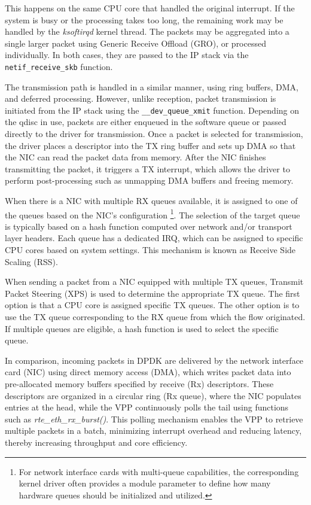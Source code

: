 This happens on the same CPU core that handled the original interrupt. If the system is busy or the processing takes too long, the remaining work may be handled by the \textit{ksoftirqd} kernel thread. 
The packets may be aggregated into a single larger packet using Generic Receive Offload (GRO), or processed individually. 
In both cases, they are passed to the IP stack via the \texttt{netif\_receive\_skb} function.

The transmission path is handled in a similar manner, using ring buffers, DMA, and deferred processing. 
However, unlike reception, packet transmission is initiated from the IP stack using the \texttt{\_\_dev\_queue\_xmit} function. 
Depending on the qdisc in use, packets are either enqueued in the software queue or passed directly to the driver for transmission.
Once a packet is selected for transmission, the driver places a descriptor into the TX ring buffer and sets up DMA so that the NIC can read the packet data from memory.
After the NIC finishes transmitting the packet, it triggers a TX interrupt, which allows the driver to perform post-processing such as unmapping DMA buffers and freeing memory.~\cite{linux-packet-input}

When there is a NIC with multiple RX queues available, it is assigned to one of the queues based on the NIC's configuration%
\footnote{For network interface cards with multi-queue capabilities, the corresponding kernel driver often provides a module parameter to define how many hardware queues should be initialized and utilized.}.
The selection of the target queue is typically based on a hash function computed over network and/or transport layer headers.
Each queue has a dedicated IRQ, which can be assigned to specific CPU cores based on system settings. This mechanism is known as Receive Side Scaling (RSS).

When sending a packet from a NIC equipped with multiple TX queues, Transmit Packet Steering (XPS) is used to determine the appropriate TX queue.
The first option is that a CPU core is assigned specific TX queues. The other option is to use the TX queue corresponding to the RX queue from which the flow originated.
If multiple queues are eligible, a hash function is used to select the specific queue.~\cite{linux-rss}

In comparison, incoming packets in DPDK are delivered by the network interface card (NIC) using direct memory access (DMA),
which writes packet data into pre-allocated memory buffers specified by receive (Rx) descriptors.
These descriptors are organized in a circular ring (Rx queue), where the NIC populates entries at the head, while the VPP continuously polls the tail using functions such as                    
\textit{rte\_eth\_rx\_burst()}. This polling mechanism enables the VPP to retrieve multiple packets in a batch,
minimizing interrupt overhead and reducing latency, thereby increasing throughput and core efficiency.~\cite{intel-core-utilization-2025}
 
